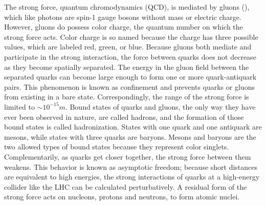 The strong force, quantum chromodynamics (QCD), is mediated by gluons (\cPg), which like photons are spin-1 gauge bosons without mass or electric charge. However, gluons do possess color charge, the quantum number on which the strong force acts. Color charge is so named because the charge has three possible values, which are labeled red, green, or blue. Because gluons both mediate and participate in the strong interaction, the force between quarks does not decrease as they become spatially separated. The energy in the gluon field between the separated quarks can become large enough to form one or more quark-antiquark pairs. This phenomenon is known as confinement and prevents quarks or gluons from existing in a bare state. Correspondingly, the range of the strong force is limited to $\sim 10^{-15}\unit{m}$. Bound states of quarks and gluons, the only way they have ever been observed in nature, are called hadrons, and the formation of those bound states is called hadronization. States with one quark and one antiquark are mesons, while states with three quarks are baryons. Mesons and baryons are the two allowed types of bound states because they represent color singlets. Complementarily, as quarks get closer together, the strong force between them weakens. This behavior is known as asymptotic freedom; because short distances are equivalent to high energies, the strong interactions of quarks at a high-energy collider like the LHC can be calculated perturbatively. A residual form of the strong force acts on nucleons, protons and neutrons, to form atomic nuclei.

